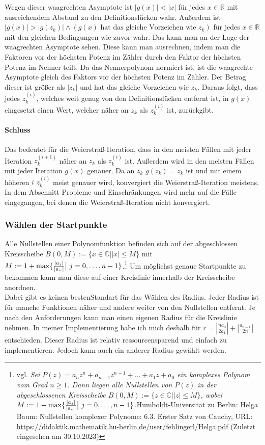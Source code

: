 \documentclass[12pt]{article}
\begin{document}
Wegen dieser waagrechten Asymptote ist $|g(x)|<|x|$ für jedes $x \in \mathbb{R}$ mit ausreichendem Abstand zu den Definitionslücken wahr. Außerdem ist $|g(x)|>|g(z_k)| \land (g(x) \text{ hat das gleiche Vorzeichen wie } z_k)$ für jedes $x \in \mathbb{R}$ mit den gleichen Bedingungen wie zuvor wahr.
Das kann man an der Lage der waagrechten Asymptote sehen. Diese kann man ausrechnen, indem man die Faktoren vor der höchsten Potenz im Zähler durch den Faktor der höchsten Potenz im Nenner teilt. Da das Nennerpolynom normiert ist, ist die waagrechte Asymptote gleich des Faktors vor der höchsten Potenz im Zähler. Der Betrag dieser ist größer als $|z_k|$ und hat das gleiche Vorzeichen wie $z_k$.
Daraus folgt, dass jedes $z_k^{(i)}$, welches weit genug von den Definitionslücken entfernt ist, in $g(x)$ eingesetzt einen Wert, welcher näher an $z_k$ als $z_k^{(i)}$ ist, zurückgibt.

\paragraph{Schluss}
Das bedeutet für die Weierstraß-Iteration, dass in den meisten Fällen mit jeder Iteration $z_k^{(i+1)}$ näher an $z_k$ als $z_k^{(i)}$ ist. Außerdem wird in den meisten Fällen mit jeder Iteration $g(x)$ genauer. Da an $z_k$ $g(z_k) = z_k$ ist und mit einem höheren $i$ $z_k^{(i)}$ meist genauer wird, konvergiert die Weierstraß-Iteration meistens. In dem Abschnitt Probleme und Einschränkungen wird mehr auf die Fälle eingegangen, bei denen die Weierstraß-Iteration nicht konvergiert.

\subsubsection{Wählen der Startpunkte}
Alle Nullstellen einer Polynomfunktion befinden sich auf der abgeschlossen Kreisscheibe  $B(0,M) := \{x \in \mathbb{C} \bigr| |x| \le M\}$ mit $M := 1 + \max\{\frac{|a_j|}{|a_n|}\bigr|\text{\space}j=0,\dots,n-1\}$.\footnote{vgl. \glqq\textit{Sei $P(z) = a_nz^n+a_{n-1}z^{n-1}+\dots+a_1z+a_0$ ein komplexes Polynom vom Grad $n \ge 1$. Dann liegen alle Nullstellen von $P(z)$ in der abgeschlossenen Kreisscheibe $B(0,M) := \{z \in \mathbb{C} \bigr| |z| \le M\}$, wobei $M := 1 + \max\{\frac{|a_j|}{|a_n|}\bigr|\text{\space}j=0,\dots,n-1\}$.}\grqq\space Humboldt-Universität zu Berlin: Helga Baum: Nullstellen komplexer Polynome: 6.3. Erster Satz von Cauchy, URL: \url{https://didaktik.mathematik.hu-berlin.de/user/fehlingerl/Helga.pdf} (Zuletzt eingesehen am 30.10.2023)}  Um möglichst genaue Startpunkte zu bekommen kann man diese auf einer Kreislinie innerhalb der Kreisscheibe anordnen. \\
Dabei gibt es keinen \glqq besten\grqq\space Standart für das Wählen des Radius. Jeder Radius ist für manche Funktionen näher und andere weiter von den Nullstellen entfernt. Je nach den Anforderungen kann man einen eigenen Radius für die Kreislinie nehmen. In meiner Implementierung habe ich mich deshalb für $r = |\frac{na_0}{2a_1}| + |\frac{a_{n-1}}{2n}|$ entschieden.
Dieser Radius ist relativ ressourcensparend und einfach zu implementieren. Jedoch kann auch ein anderer Radius gewählt werden.
\end{document}
